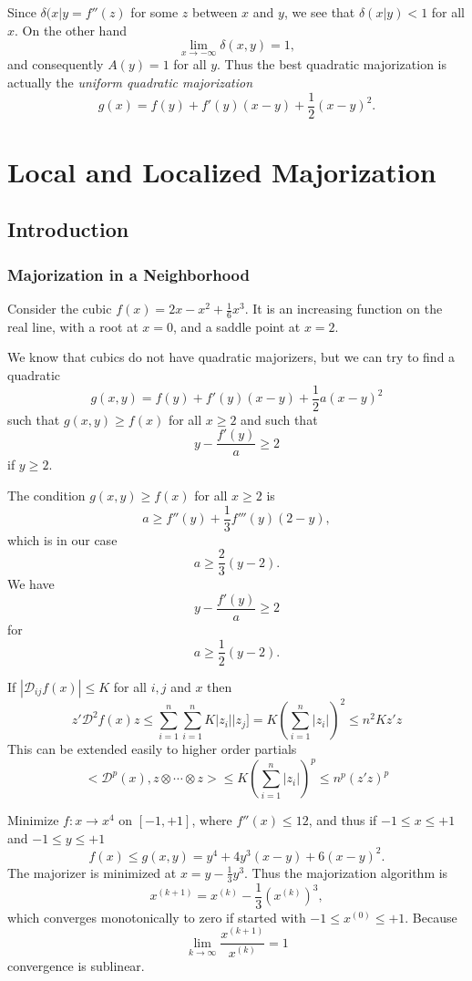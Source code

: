 \documentclass[
  12pt,
]{book}
\begin{document}
Since \(\delta(x|y=f''(z)\) for some \(z\) between \(x\) and \(y\), we see that \(\delta(x|y)<1\) for all \(x\). On the other hand
\[
\lim_{x\rightarrow-\infty}\delta(x,y)=1,
\]
and consequently \(A(y)=1\) for all \(y\). Thus the best quadratic majorization is actually the
\emph{uniform quadratic majorization}
\[
g(x)=f(y)+f'(y)(x-y)+\frac12 (x-y)^2.
\]

\hypertarget{local-and-localized-majorization}{%
\chapter{Local and Localized Majorization}\label{local-and-localized-majorization}}

\hypertarget{introduction-7}{%
\section{Introduction}\label{introduction-7}}

\hypertarget{majorization-in-a-neighborhood}{%
\subsection{Majorization in a Neighborhood}\label{majorization-in-a-neighborhood}}

Consider the cubic \(f(x)=2x-x^2+\frac16 x^3\). It is an increasing function on the real line, with a root at \(x=0\), and a saddle point at \(x=2\).

We know that cubics do not have quadratic majorizers, but we can try to find a quadratic
\[
g(x,y)=f(y)+f'(y)(x-y)+\frac12 a(x-y)^2
\]
such that \(g(x,y)\geq f(x)\) for all \(x\geq 2\) and such that
\[
y-\frac{f'(y)}{a}\geq 2
\]
if \(y\geq 2\).

The condition \(g(x,y)\geq f(x)\) for all \(x\geq 2\) is
\[
a\geq f''(y)+\frac13 f'''(y)(2-y),
\]
which is in our case
\[
a\geq \frac23(y-2).
\]
We have
\[
y-\frac{f'(y)}{a}\geq 2
\]
for
\[
a\geq\frac12(y-2).
\]

If \(|\mathcal{D}_{ij}f(x)|\leq K\) for all \(i,j\) and \(x\) then
\[
z'\mathcal{D}^2f(x)z\leq \sum_{i=1}^n\sum_{i=1}^n K|z_i||z_j]=
K(\sum_{i=1}^n |z_i|)^2\leq n^2Kz'z
\]
This can be extended easily to higher order partials
\[
<\mathcal{D}^p(x),z\otimes\cdots\otimes z>\leq K(\sum_{i=1}^n|z_i|)^p\leq
n^p(z'z)^p
\]

Minimize \(f:x\rightarrow x^4\) on \([-1,+1]\), where \(f''(x)\leq 12\), and thus
if \(-1\leq x\leq +1\) and \(-1\leq y\leq +1\)
\[
f(x)\leq g(x,y)=y^4+4y^3(x-y)+6(x-y)^2.
\]
The majorizer is minimized at \(x=y-\frac13 y^3\). Thus the majorization algorithm is
\[
x^{(k+1)}=x^{(k)}-\frac13 (x^{(k)})^3,
\]
which converges monotonically to zero if started with \(-1\leq x^{(0)}\leq +1\).
Because
\[
\lim_{k\rightarrow\infty}\frac{x^{(k+1)}}{x^{(k)}}=1
\]
convergence is sublinear.
\end{document}
